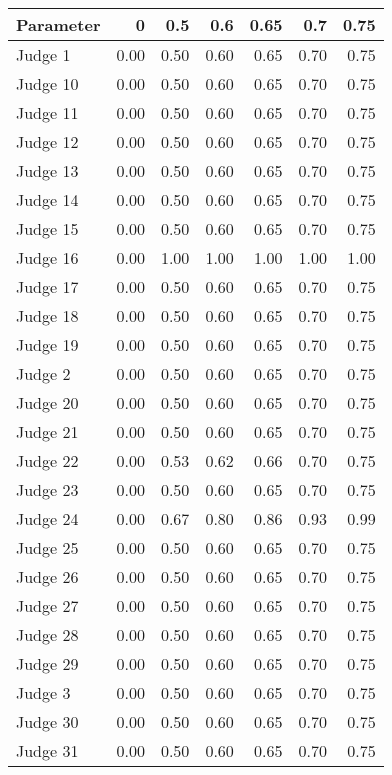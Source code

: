 \begin{tabular}{lrrrrrr}
\toprule
Parameter &    0 &  0.5 &  0.6 &  0.65 &  0.7 &  0.75 \\
\midrule
  Judge 1 & 0.00 & 0.50 & 0.60 &  0.65 & 0.70 &  0.75 \\
 Judge 10 & 0.00 & 0.50 & 0.60 &  0.65 & 0.70 &  0.75 \\
 Judge 11 & 0.00 & 0.50 & 0.60 &  0.65 & 0.70 &  0.75 \\
 Judge 12 & 0.00 & 0.50 & 0.60 &  0.65 & 0.70 &  0.75 \\
 Judge 13 & 0.00 & 0.50 & 0.60 &  0.65 & 0.70 &  0.75 \\
 Judge 14 & 0.00 & 0.50 & 0.60 &  0.65 & 0.70 &  0.75 \\
 Judge 15 & 0.00 & 0.50 & 0.60 &  0.65 & 0.70 &  0.75 \\
 Judge 16 & 0.00 & 1.00 & 1.00 &  1.00 & 1.00 &  1.00 \\
 Judge 17 & 0.00 & 0.50 & 0.60 &  0.65 & 0.70 &  0.75 \\
 Judge 18 & 0.00 & 0.50 & 0.60 &  0.65 & 0.70 &  0.75 \\
 Judge 19 & 0.00 & 0.50 & 0.60 &  0.65 & 0.70 &  0.75 \\
  Judge 2 & 0.00 & 0.50 & 0.60 &  0.65 & 0.70 &  0.75 \\
 Judge 20 & 0.00 & 0.50 & 0.60 &  0.65 & 0.70 &  0.75 \\
 Judge 21 & 0.00 & 0.50 & 0.60 &  0.65 & 0.70 &  0.75 \\
 Judge 22 & 0.00 & 0.53 & 0.62 &  0.66 & 0.70 &  0.75 \\
 Judge 23 & 0.00 & 0.50 & 0.60 &  0.65 & 0.70 &  0.75 \\
 Judge 24 & 0.00 & 0.67 & 0.80 &  0.86 & 0.93 &  0.99 \\
 Judge 25 & 0.00 & 0.50 & 0.60 &  0.65 & 0.70 &  0.75 \\
 Judge 26 & 0.00 & 0.50 & 0.60 &  0.65 & 0.70 &  0.75 \\
 Judge 27 & 0.00 & 0.50 & 0.60 &  0.65 & 0.70 &  0.75 \\
 Judge 28 & 0.00 & 0.50 & 0.60 &  0.65 & 0.70 &  0.75 \\
 Judge 29 & 0.00 & 0.50 & 0.60 &  0.65 & 0.70 &  0.75 \\
  Judge 3 & 0.00 & 0.50 & 0.60 &  0.65 & 0.70 &  0.75 \\
 Judge 30 & 0.00 & 0.50 & 0.60 &  0.65 & 0.70 &  0.75 \\
 Judge 31 & 0.00 & 0.50 & 0.60 &  0.65 & 0.70 &  0.75 \\

\end{tabular}
